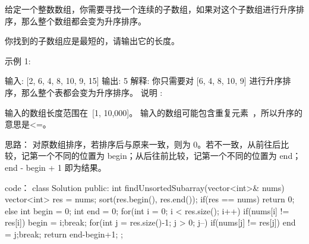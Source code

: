 给定一个整数数组，你需要寻找一个连续的子数组，如果对这个子数组进行升序排序，那么整个数组都会变为升序排序。

你找到的子数组应是最短的，请输出它的长度。

示例 1:

输入: [2, 6, 4, 8, 10, 9, 15]
输出: 5
解释: 你只需要对 [6, 4, 8, 10, 9] 进行升序排序，那么整个表都会变为升序排序。
说明 :

输入的数组长度范围在 [1, 10,000]。
输入的数组可能包含重复元素 ，所以升序的意思是<=。



























思路：
对原数组排序，若排序后与原来一致，则为 0。若不一致，从前往后比较，记第一个不同的位置为 begin；从后往前比较，记第一个不同的位置为 end；
end - begin + 1 即为结果。


























code：
class Solution {
public:
    int findUnsortedSubarray(vector<int>& nums) {
        vector<int> res = nums;
        sort(res.begin(), res.end());
        if(res == nums) return 0;
        else
        {
            int begin = 0;
            int end = 0;
            for(int i = 0; i < res.size(); i++)
            {
                if(nums[i] != res[i])
                {
                    begin = i;break;
                }
            }
            for(int j = res.size()-1; j > 0; j--)
            {
                if(nums[j] != res[j])
                {
                    end = j;break;
                }
            }
            return end-begin+1;
        }    
    }
};